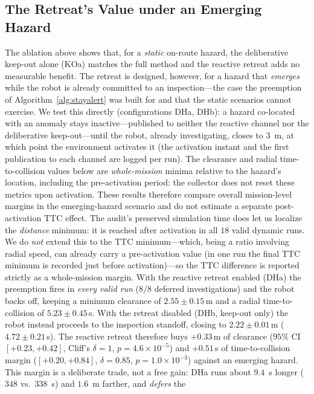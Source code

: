 \subsection{The Retreat's Value under an Emerging Hazard}
\label{sec:emerging}
The ablation above shows that, for a \emph{static} on-route hazard, the
deliberative keep-out alone (KOa) matches the full method and the reactive retreat
adds no measurable benefit. The retreat is designed, however, for a hazard that
\emph{emerges} while the robot is already committed to an inspection---the case the
preemption of Algorithm~\ref{alg:stayalert} was built for and that the static
scenarios cannot exercise. We test this directly (configurations DHa, DHb): a
hazard co-located with an anomaly stays inactive---published to neither the
reactive channel nor the deliberative keep-out---until the robot, already
investigating, closes to $3$~m, at which point the environment activates it (the
activation instant and the first publication to each channel are logged per run).
The clearance and radial time-to-collision values below are \emph{whole-mission}
minima relative to the hazard's location, including the pre-activation period: the
collector does not reset these metrics upon activation. These results therefore
compare overall mission-level margins in the emerging-hazard scenario and do not
estimate a separate post-activation TTC effect. The audit's preserved simulation
time does let us localize the \emph{distance} minimum: it is reached after
activation in all $18$ valid dynamic runs. We do \emph{not} extend this to the TTC
minimum---which, being a ratio involving radial speed, can already carry a
pre-activation value (in one run the final TTC minimum is recorded just before
activation)---so the TTC difference is reported strictly as a whole-mission margin. With the
reactive retreat enabled (DHa) the preemption fires in \emph{every valid run}
($8/8$ deferred investigations) and the robot backs off, keeping a minimum
clearance of $2.55\pm0.15$\,m and a radial time-to-collision of $5.23\pm0.45$\,s.
With the retreat disabled (DHb, keep-out only) the robot instead proceeds to the
inspection standoff, closing to $2.22\pm0.01$\,m ($4.72\pm0.21$\,s). The reactive
retreat therefore buys $+0.33$\,m of clearance ($95\%$ CI $[+0.23,+0.42]$, Cliff's
$\delta=1$, $p=4.6{\times}10^{-5}$) and $+0.51$\,s of time-to-collision margin
($[+0.20,+0.84]$, $\delta=0.85$, $p=1.0{\times}10^{-3}$) against an emerging
hazard. This margin is a deliberate trade, not a free gain: DHa runs about
$9.4$~s longer ($348$ vs.\ $338$~s) and $1.6$~m farther, and \emph{defers} the
